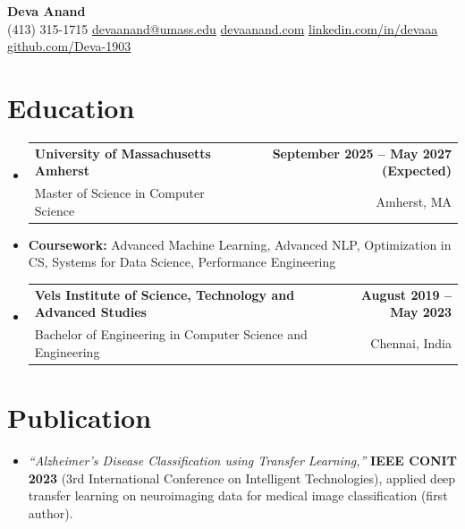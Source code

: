 \documentclass[letterpaper,10pt]{article}
\makeatletter
\newcommand{\resumeSubheading}[4]{
  \vspace{1pt}\item
    \begin{tabular*}{0.985\textwidth}[t]{l@{\extracolsep{\fill}}r}
      \textbf{#1} & \textbf{\small #2} \\
      {\small\color{ResumeSlate} #3} & {\small\color{ResumeSlate} #4} \\
    \end{tabular*}\vspace{-6pt}
}
\newcommand{\resumeSubItem}[1]{\item[]\small{#1\vspace{-1pt}}}
\newcommand{\resumeSubHeadingListStart}{\begin{itemize}[leftmargin=0.0in, label={}, itemsep=2pt, topsep=2pt]}
\newcommand{\resumeSubHeadingListEnd}{\end{itemize}}
\makeatother
\begin{document}
\begin{center}
    {\LARGE \bfseries \textcolor{ResumeNavy}{Deva Anand}} \\ \vspace{4pt}
    \small
    (413) 315-1715 \enspace\textbar\enspace
    \href{mailto:devaanand@umass.edu}{devaanand@umass.edu} \enspace\textbar\enspace
    \href{https://devaanand.com}{devaanand.com} \enspace\textbar\enspace
    \href{https://linkedin.com/in/devaaa/}{linkedin.com/in/devaaa} \enspace\textbar\enspace
    \href{https://github.com/Deva-1903}{github.com/Deva-1903}
    \vspace{-6pt}
\end{center}
\section{Education}
\resumeSubHeadingListStart
  \resumeSubheading
    {University of Massachusetts Amherst}{September 2025 -- May 2027 (Expected)}
    {Master of Science in Computer Science}{Amherst, MA}
  \resumeSubItem{\textbf{Coursework:} Advanced Machine Learning, Advanced NLP, Optimization in CS, Systems for Data Science, Performance Engineering}
  \resumeSubheading
    {Vels Institute of Science, Technology and Advanced Studies}{August 2019 -- May 2023}
    {Bachelor of Engineering in Computer Science and Engineering}{Chennai, India}
\resumeSubHeadingListEnd
\vspace{-4pt}
\section{Publication}
\begin{itemize}[leftmargin=0.18in, itemsep=0pt, topsep=1pt]
  \item\small \textit{``Alzheimer's Disease Classification using Transfer Learning,''} \textbf{IEEE CONIT 2023} (3rd International Conference on Intelligent Technologies), applied deep transfer learning on neuroimaging data for medical image classification (first author).
\end{itemize}
\vspace{-4pt}
\end{document}
